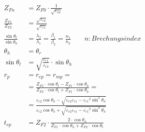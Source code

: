 \begin{align*}
    Z_{Fn}                            & = Z_{F0}\cdot\frac{1}{\sqrt{\varepsilon_{rn}}}                                                                                                                                                                              \\
    \frac{Z_{F1}}{Z_{F2}}             & = \frac{\sqrt{\varepsilon_{r2}}}{\sqrt{\varepsilon_{r1}}}                                                                                                                                                                   \\
    \frac{\sin\theta_t}{\sin\theta_h} & = \frac{\lambda_2}{\lambda_1}= \frac{\beta_1}{\beta_2}= \frac{n_1}{n_2} \qquad n: Brechungsindex                                                                                                                            \\
    \theta_h                          & = \theta_r                                                                                                                                                                                                                  \\
    \sin\theta_t                      & = \sqrt{\frac{\varepsilon_{r1}}{\varepsilon_{r2}}}\cdot\sin\theta_h                                                                                                                                                         \\
    r_p                               & =  r_{e p} = r_{m p} =                                                                                                                                                                                                      \\
                                      & = \frac{Z_{F 2} \cdot \cos \theta_t-Z_{F 1} \cdot \cos \theta_h}{Z_{F 2} \cdot \cos \theta_t+Z_{F 1} \cdot \cos \theta_h} =                                                                                                 \\
                                      & = \frac{\varepsilon_{r2}\cos\theta_h-\sqrt{\varepsilon_{r2}\varepsilon_{r1}-{\varepsilon_{r1}}^2\sin^2\theta_h}}{\varepsilon_{r2}\cos\theta_h+\sqrt{{\varepsilon_{r2}\varepsilon_{r1}-{\varepsilon_{r1}}^2\sin^2\theta_h}}} \\
    t_{e p}                           & = Z_{F 2} \cdot \frac{2 \cdot \cos \theta_h}{Z_{F 1} \cdot \cos \theta_h+Z_{F 2} \cdot \cos \theta_t}                                                                                                                       \\

\end{align*}
